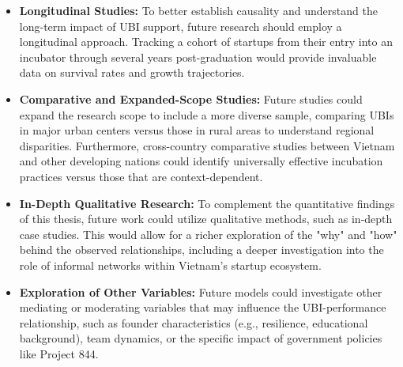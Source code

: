 \documentclass[../Main.tex]{subfiles}
\begin{document}
	\begin{itemize}
		\item \textbf{Longitudinal Studies:} To better establish causality and understand the long-term impact of UBI support, future research should employ a longitudinal approach. Tracking a cohort of startups from their entry into an incubator through several years post-graduation would provide invaluable data on survival rates and growth trajectories.
		
		\item \textbf{Comparative and Expanded-Scope Studies:} Future studies could expand the research scope to include a more diverse sample, comparing UBIs in major urban centers versus those in rural areas to understand regional disparities. Furthermore, cross-country comparative studies between Vietnam and other developing nations could identify universally effective incubation practices versus those that are context-dependent.
		
		\item \textbf{In-Depth Qualitative Research:} To complement the quantitative findings of this thesis, future work could utilize qualitative methods, such as in-depth case studies. This would allow for a richer exploration of the "why" and "how" behind the observed relationships, including a deeper investigation into the role of informal networks within Vietnam's startup ecosystem.
		
		\item \textbf{Exploration of Other Variables:} Future models could investigate other mediating or moderating variables that may influence the UBI-performance relationship, such as founder characteristics (e.g., resilience, educational background), team dynamics, or the specific impact of government policies like Project 844.
	\end{itemize}
	
\end{document}
